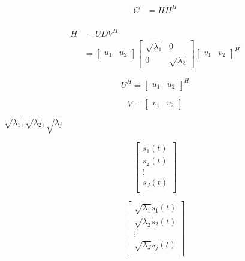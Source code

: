 \documentclass{ltjsarticle}
\begin{document}
\begin{align*}
  G &= HH^H\\
\end{align*}

\begin{align*}
  H &= UDV^H\\
    &=
    \begin{bmatrix}
      u_1 & u_2
    \end{bmatrix}
    \begin{bmatrix}
      \sqrt{\lambda_1} & 0\\
      0 & \sqrt{\lambda_2}
    \end{bmatrix}
    \begin{bmatrix}
      v_1 & v_2
    \end{bmatrix}^H
\end{align*}

\begin{equation*}
  U^H =
  \begin{bmatrix}
    u_1 & u_2
  \end{bmatrix}^H
\end{equation*}

\begin{equation*}
  V =
  \begin{bmatrix}
    v_1 & v_2
  \end{bmatrix}
\end{equation*}

$\sqrt{\lambda_1},\sqrt{\lambda_2},\sqrt{\lambda_j}$

\begin{equation*}
  \begin{bmatrix}
    s_1(t)\\
    s_2(t)\\
    \vdots\\
    s_J(t)\\
  \end{bmatrix}
\end{equation*}

\begin{equation*}
  \begin{bmatrix}
    \sqrt{\lambda_1}s_1(t)\\
    \sqrt{\lambda_2}s_2(t)\\
    \vdots\\
    \sqrt{\lambda_J}s_j(t)\\
  \end{bmatrix}
\end{equation*}

\end{document}
